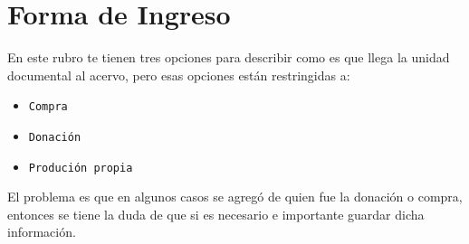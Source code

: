 \documentclass[10pt,letterpaper]{article}
\begin{document}
\section{Forma de Ingreso}
En este rubro te tienen tres opciones para describir como es que llega la unidad documental al acervo, pero esas opciones están restringidas a:

\begin{itemize}
	\item \texttt{Compra}
	\item \texttt{Donación}
	\item \texttt{Produción propia}
\end{itemize}

El problema es que en algunos casos se agregó de quien fue la donación o compra, entonces se tiene la duda de que si es necesario e importante guardar dicha información.
\end{document}
